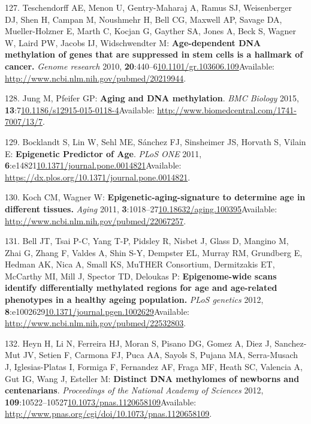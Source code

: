 \documentclass[
]{book}
\begin{document}
\leavevmode\hypertarget{ref-Teschendorff2010}{}%
127. Teschendorff AE, Menon U, Gentry-Maharaj A, Ramus SJ, Weisenberger DJ, Shen H, Campan M, Noushmehr H, Bell CG, Maxwell AP, Savage DA, Mueller-Holzner E, Marth C, Kocjan G, Gayther SA, Jones A, Beck S, Wagner W, Laird PW, Jacobs IJ, Widschwendter M: \textbf{Age-dependent DNA methylation of genes that are suppressed in stem cells is a hallmark of cancer.} \emph{Genome research} 2010, \textbf{20}:440--6\href{https://doi.org/10.1101/gr.103606.109}{10.1101/gr.103606.109}Available: \url{http://www.ncbi.nlm.nih.gov/pubmed/20219944}.

\leavevmode\hypertarget{ref-Jung2015}{}%
128. Jung M, Pfeifer GP: \textbf{Aging and DNA methylation}. \emph{BMC Biology} 2015, \textbf{13}:7\href{https://doi.org/10.1186/s12915-015-0118-4}{10.1186/s12915-015-0118-4}Available: \url{http://www.biomedcentral.com/1741-7007/13/7}.

\leavevmode\hypertarget{ref-Bocklandt2011}{}%
129. Bocklandt S, Lin W, Sehl ME, Sánchez FJ, Sinsheimer JS, Horvath S, Vilain E: \textbf{Epigenetic Predictor of Age}. \emph{PLoS ONE} 2011, \textbf{6}:e14821\href{https://doi.org/10.1371/journal.pone.0014821}{10.1371/journal.pone.0014821}Available: \url{https://dx.plos.org/10.1371/journal.pone.0014821}.

\leavevmode\hypertarget{ref-Koch2011}{}%
130. Koch CM, Wagner W: \textbf{Epigenetic-aging-signature to determine age in different tissues.} \emph{Aging} 2011, \textbf{3}:1018--27\href{https://doi.org/10.18632/aging.100395}{10.18632/aging.100395}Available: \url{http://www.ncbi.nlm.nih.gov/pubmed/22067257}.

\leavevmode\hypertarget{ref-Bell2012}{}%
131. Bell JT, Tsai P-C, Yang T-P, Pidsley R, Nisbet J, Glass D, Mangino M, Zhai G, Zhang F, Valdes A, Shin S-Y, Dempster EL, Murray RM, Grundberg E, Hedman AK, Nica A, Small KS, MuTHER Consortium, Dermitzakis ET, McCarthy MI, Mill J, Spector TD, Deloukas P: \textbf{Epigenome-wide scans identify differentially methylated regions for age and age-related phenotypes in a healthy ageing population.} \emph{PLoS genetics} 2012, \textbf{8}:e1002629\href{https://doi.org/10.1371/journal.pgen.1002629}{10.1371/journal.pgen.1002629}Available: \url{http://www.ncbi.nlm.nih.gov/pubmed/22532803}.

\leavevmode\hypertarget{ref-Heyn2012}{}%
132. Heyn H, Li N, Ferreira HJ, Moran S, Pisano DG, Gomez A, Diez J, Sanchez-Mut JV, Setien F, Carmona FJ, Puca AA, Sayols S, Pujana MA, Serra-Musach J, Iglesias-Platas I, Formiga F, Fernandez AF, Fraga MF, Heath SC, Valencia A, Gut IG, Wang J, Esteller M: \textbf{Distinct DNA methylomes of newborns and centenarians}. \emph{Proceedings of the National Academy of Sciences} 2012, \textbf{109}:10522--10527\href{https://doi.org/10.1073/pnas.1120658109}{10.1073/pnas.1120658109}Available: \url{http://www.pnas.org/cgi/doi/10.1073/pnas.1120658109}.
\end{document}
